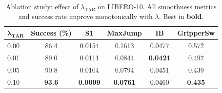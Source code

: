 \begin{table}[t]
\centering
\caption{Ablation study: effect of $\lambda_{\text{TAR}}$ on LIBERO-10. All smoothness metrics and success rate improve monotonically with $\lambda$. Best in \textbf{bold}.}
\label{tab:ablation}
\small
\begin{tabular}{lccccc}
\toprule
$\boldsymbol{\lambda_{\text{TAR}}}$ & \textbf{Success (\%)} & \textbf{S1} & \textbf{MaxJump} & \textbf{IB} & \textbf{GripperSw} \\
\midrule
0.00 & 86.4 & 0.0154 & 0.1613 & 0.0477 & 0.572 \\
0.01 & 89.0 & 0.0111 & 0.0844 & \textbf{0.0421} & 0.497 \\
0.05 & 90.8 & 0.0104 & 0.0794 & 0.0451 & 0.439 \\
0.10 & \textbf{93.6} & \textbf{0.0099} & \textbf{0.0761} & 0.0460 & \textbf{0.435} \\
\bottomrule
\end{tabular}
\end{table}
